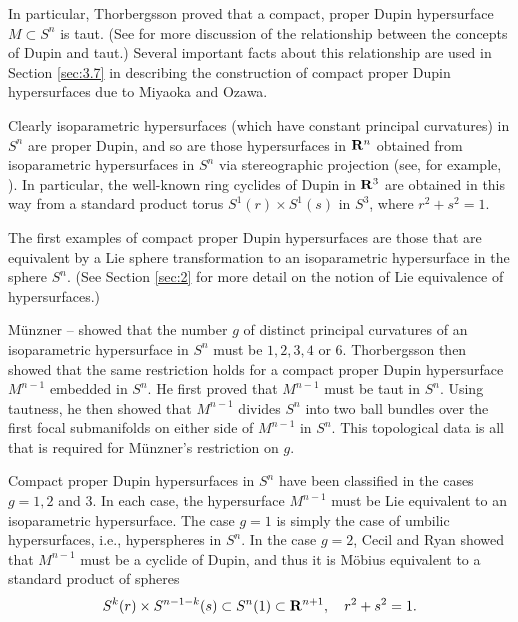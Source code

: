 \documentclass[12pt]{article}
\begin{document}
In particular, Thorbergsson \cite{Th1} proved that a compact, proper Dupin hypersurface $M \subset S^n$ is taut.
(See \cite[pp. 65--74]{CR8} for more discussion of the relationship
between the concepts of Dupin and taut.) Several important facts about this relationship 
are used in Section \ref{sec:3.7} in describing the construction of 
compact proper Dupin hypersurfaces due to Miyaoka and Ozawa.





Clearly isoparametric  hypersurfaces (which have constant principal curvatures) in $S^n$ are proper Dupin, and so are
those hypersurfaces in ${\bf R}^n$ obtained from isoparametric hypersurfaces in $S^n$ via
stereographic projection (see, for example, \cite[pp. 28--30]{CR8}).  
In particular, the well-known ring cyclides of Dupin in ${\bf R}^3$ are obtained
in this way from a standard product torus $S^1(r) \times S^1(s)$ in $S^3$, where $r^2+s^2=1$.



 
The first examples of compact proper Dupin hypersurfaces are those that are equivalent by a Lie sphere transformation
to an isoparametric hypersurface in the sphere $S^n$.  (See Section \ref{sec:2} for more detail on the notion of Lie equivalence of hypersurfaces.)

M\"{u}nzner
\cite{Mu}--\cite{Mu2} showed that the number $g$ of distinct principal curvatures of an 
isoparametric hypersurface
in $S^n$ must be $1,2,3,4$ or 6.  Thorbergsson \cite{Th1} then
showed that the same restriction holds for a compact proper Dupin hypersurface $M^{n-1}$ embedded in $S^n$.  
He first proved that $M^{n-1}$ must be taut
in $S^n$. Using tautness, he then showed that $M^{n-1}$ divides $S^n$
into two ball bundles over the first focal submanifolds on either side of $M^{n-1}$ in $S^n$.  This topological data
is all that is required for M\"{u}nzner's restriction on $g$.

Compact proper Dupin hypersurfaces in $S^n$ have been classified in the cases $g = 1,2$ and 3.  In each case, 
the hypersurface $M^{n-1}$ must be Lie equivalent 
to an isoparametric hypersurface.  The case $g = 1$ is simply the case of umbilic
hypersurfaces, 
i.e., hyperspheres in $S^n$.  In the case $g=2$, Cecil and Ryan \cite{CR2} showed that $M^{n-1}$
must be a cyclide of Dupin, and thus it is M\"{o}bius equivalent to a standard product of spheres
\begin{displaymath}
S^k (r) \times S^{n-1-k} (s) \subset S^n (1) \subset {\bf R}^{n+1}, \quad r^2 + s^2 = 1.
\end{displaymath}
\end{document}
